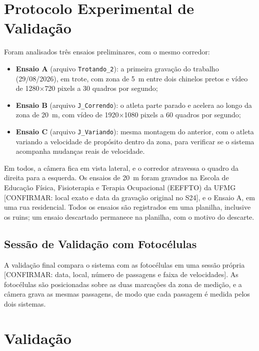 \documentclass[
    12pt,               %
    openright,          %
    twoside,            %
    a4paper,            %
    chapter=TITLE,      %
    english,            %
    brazil              %
    ]{abntex2}
\begin{document}
\section{Protocolo Experimental de Validação}
\label{sec:protocolo}

Foram analisados três ensaios preliminares, com o mesmo corredor:
\begin{itemize}
    \item \textbf{Ensaio A} (arquivo \texttt{Trotando\_2}): a primeira gravação do trabalho (29/08/2026), em trote, com zona de 5~m entre dois chinelos pretos e vídeo de 1280$\times$720 pixels a 30 quadros por segundo;
    \item \textbf{Ensaio B} (arquivo \texttt{J\_Correndo}): o atleta parte parado e acelera ao longo da zona de 20~m, com vídeo de 1920$\times$1080 pixels a 60 quadros por segundo;
    \item \textbf{Ensaio C} (arquivo \texttt{J\_Variando}): mesma montagem do anterior, com o atleta variando a velocidade de propósito dentro da zona, para verificar se o sistema acompanha mudanças reais de velocidade.
\end{itemize}
Em todos, a câmera fica em vista lateral, e o corredor atravessa o quadro da direita para a esquerda. Os ensaios de 20~m foram gravados na Escola de Educação Física, Fisioterapia e Terapia Ocupacional (EEFFTO) da UFMG [CONFIRMAR: local exato e data da gravação original no S24], e o Ensaio A, em uma rua residencial. Todos os ensaios são registrados em uma planilha, inclusive os ruins; um ensaio descartado permanece na planilha, com o motivo do descarte.

\subsection{Sessão de Validação com Fotocélulas}
\label{sec:sessao_fotocelulas}
A validação final compara o sistema com as fotocélulas em uma sessão própria [CONFIRMAR: data, local, número de passagens e faixa de velocidades]. As fotocélulas são posicionadas sobre as duas marcações da zona de medição, e a câmera grava as mesmas passagens, de modo que cada passagem é medida pelos dois sistemas.

\section{Validação}
\label{sec:validacao}
\end{document}
